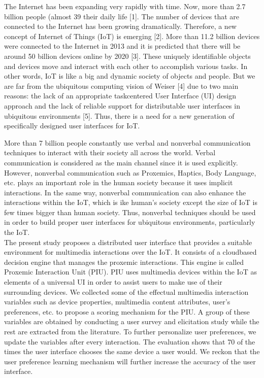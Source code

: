 \documentclass[]{IEEEphot}
\begin{document}
The Internet has been expanding very rapidly with time. Now, more than 2.7
billion people (almost 39%
their daily life [1]. The number of devices that are connected to the Internet has
been growing dramatically. Therefore, a new concept of Internet of Things (IoT)
is emerging [2]. More than 11.2 billion devices were connected to the Internet in
2013 and it is predicted that there will be around 50 billion devices online by 2020
[3]. These uniquely identifiable objects and devices move and interact with each
other to accomplish various tasks. In other words, IoT is like a big and dynamic
society of objects and people. But we are far from the ubiquitous computing
vision of Weiser [4] due to two main reasons: the lack of an appropriate taskcentered User Interface (UI) design approach and the lack of reliable support
for distributable user interfaces in ubiquitous environments [5]. Thus, there is a
need for a new generation of specifically designed user interfaces for IoT.



More than 7 billion people constantly use verbal and nonverbal communication techniques to interact with their society all across the world. Verbal communication is considered as the main channel since it is used explicitly. However, nonverbal communication such as Proxemics, Haptics, Body Language, etc. plays
an important role in the human society because it uses implicit interactions. In
the same way, nonverbal communication can also enhance the interactions within
the IoT, which is ike human’s society except the size of IoT is few times bigger
than human society. Thus, nonverbal techniques should be used in order to build
proper user interfaces for ubiquitous environments, particularly the IoT.\\



The present study proposes a distributed user interface that provides a suitable environment for multimedia interactions over the IoT. It consists of a cloudbased decision engine that manages the proxemic interactions. This engine is
called Proxemic Interaction Unit (PIU). PIU uses multimedia devices within
the IoT as elements of a universal UI in order to assist users to make use of
their surrounding devices. We collected some of the effectual multimedia interaction variables such as device properties, multimedia content attributes, user’s
preferences, etc. to propose a scoring mechanism for the PIU. A group of these
variables are obtained by conducting a user survey and elicitation study while
the rest are extracted from the literature. To further personalize user preferences,
we update the variables after every interaction. The evaluation shows that 70%
of the times the user interface chooses the same device a user would. We reckon
that the user preference learning mechanism will further increase the accuracy
of the user interface.
\end{document}
